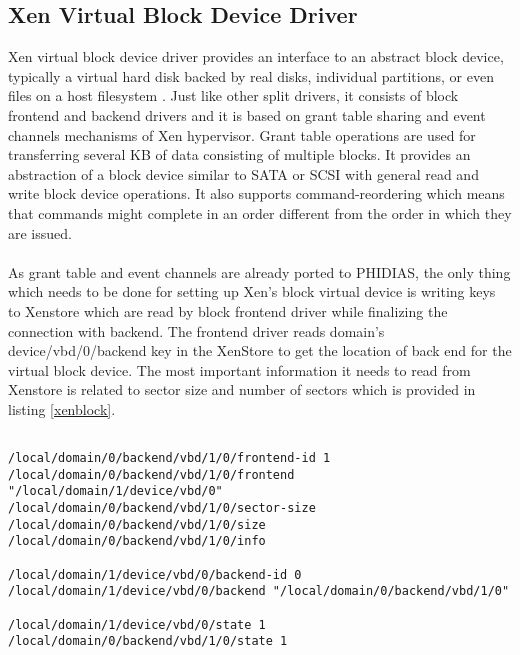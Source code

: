 \subsection{Xen Virtual Block Device Driver \label{sec:block}}
Xen virtual block device driver provides an interface to an abstract block device, typically a virtual hard disk backed by real disks, individual partitions, or even files on a host filesystem \cite{xen_book}. Just like other split drivers, it consists of block frontend and backend drivers and it is based on grant table sharing and event channels mechanisms of Xen hypervisor. Grant table operations are used for transferring several KB of data consisting of multiple blocks. It provides an abstraction of a block device similar to SATA or SCSI with general read and write block device operations. It also supports command-reordering which means that commands might complete in an order different from the order in which they are issued.
\\
\\
As grant table and event channels are already ported to PHIDIAS, the only thing which needs to be done for setting up Xen's block virtual device is writing keys to Xenstore which are read by block frontend driver while finalizing the connection with backend. The frontend driver reads domain's device/vbd/0/backend key in the XenStore to get the location of back end for the virtual block device. The most important information it needs to read from Xenstore is related to sector size and  number of sectors which is provided in listing \ref{xenblock}.

\begin{lstlisting}[caption= Keys in Xenstore for connecting virtual block device frontend driver with backend in Xen ,label={xenblock}]

/local/domain/0/backend/vbd/1/0/frontend-id 1
/local/domain/0/backend/vbd/1/0/frontend "/local/domain/1/device/vbd/0"
/local/domain/0/backend/vbd/1/0/sector-size
/local/domain/0/backend/vbd/1/0/size
/local/domain/0/backend/vbd/1/0/info

/local/domain/1/device/vbd/0/backend-id 0
/local/domain/1/device/vbd/0/backend "/local/domain/0/backend/vbd/1/0"

/local/domain/1/device/vbd/0/state 1
/local/domain/0/backend/vbd/1/0/state 1

\end{lstlisting}

